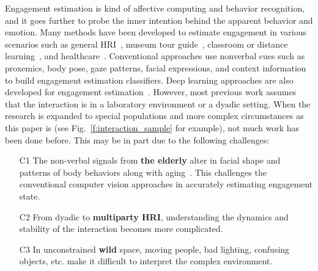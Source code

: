 \documentclass[twocolumn]{svjour3}
\begin{document}
Engagement estimation is kind of affective computing and behavior recognition, and it goes further to probe the inner intention behind the apparent behavior and emotion. Many methods have been developed to estimate engagement in various scenarios such as general HRI~\cite{Salam2017Fully, Celiktutan2019Multimodal, BenYoussef2019Early, Saleh2021Improving}, museum tour guide~\cite{DelDuchetto2020Are}, classroom or distance learning~\cite{BenEliyahu2018Investigating, Zhu2020Multirate, Rudovic2019Personalized, Sumer2021Multimodal, Monkaresi2017Automated, Abedi2021Affectdriven, Gao2020NGage}, and  healthcare~\cite{Anagnostopoulou2021Engagement, Jain2020Modeling, Jones2018Engagement, Steinert2020Engagement}. Conventional approaches use nonverbal cues such as proxemics, body pose, gaze patterns, facial expressions, and context information to build engagement estimation classifiers. Deep learning approaches are also developed for engagement estimation~\cite{DelDuchetto2020Are,Zhu2020Multirate,Guhan2020ABCNet,Saleh2021Improving,Sumer2021Multimodal,Anagnostopoulou2021Engagement}. However, most previous work assumes that the interaction is in a laboratory environment or a dyadic setting. 
When the research is expanded to special populations and more complex circumstances as this paper is (see Fig.~\ref{f:interaction_sample} for example), not much work has been done before. This may be in part due to the following challenges:
\begin{enumerate}
  \item[C1] The non-verbal signals from \textbf{the elderly} alter in facial shape and patterns of body behaviors along with aging~\cite{Guo2013Facial, Folster2014Facial}. This challenges the conventional computer vision approaches in accurately estimating engagement state.
  \item[C2] From dyadic to \textbf{multiparty HRI}, understanding the dynamics and stability of the interaction becomes more complicated.
  \item[C3] In unconstrained \textbf{wild} space, moving people, bad lighting, confusing objects, etc. make it difficult to interpret the complex environment.
\end{enumerate}
\end{document}
